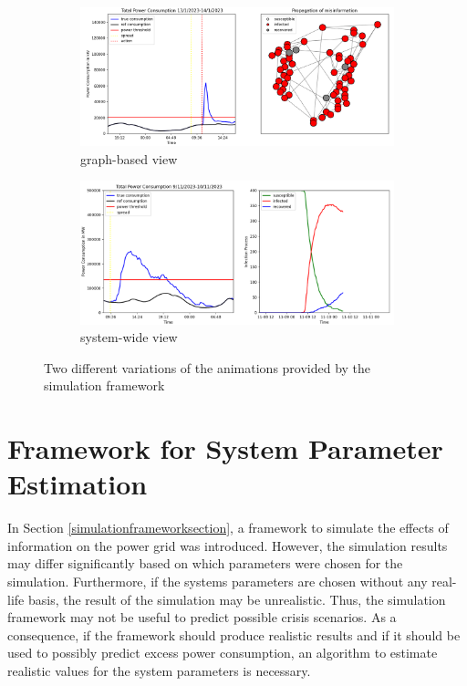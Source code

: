 \begin{figure}[!ht]
    \begin{subfigure}{\textwidth}
    \centering
    \includegraphics[scale=.5]{figs/graph-wide-view.png}
    \caption{graph-based view}
    \label{graph-view} 
    \end{subfigure}
    \begin{subfigure}{\textwidth}
    \centering
    \includegraphics[scale=.505]{figs/system-wide-view.png}
    \caption{system-wide view}
    \label{system-view}
    \end{subfigure}
    \caption{Two different variations of the animations provided
    by the simulation framework}
    \label{both-anim-views}
\end{figure}



\section{Framework for System Parameter Estimation}
\label{parameterestimationalgo}

In Section \ref{simulationframeworksection}, a framework to simulate the effects 
of information on the power grid was introduced. However, the simulation results
may differ significantly based on which parameters were chosen for the simulation.
Furthermore, if the systems parameters are chosen without any real-life basis,
the result of the simulation may be unrealistic. Thus, the simulation framework 
may not be useful to predict possible crisis scenarios.
As a consequence, if the framework should produce realistic results and if
it should be used to possibly predict excess power consumption, an 
algorithm to estimate realistic values for the system parameters is necessary.

